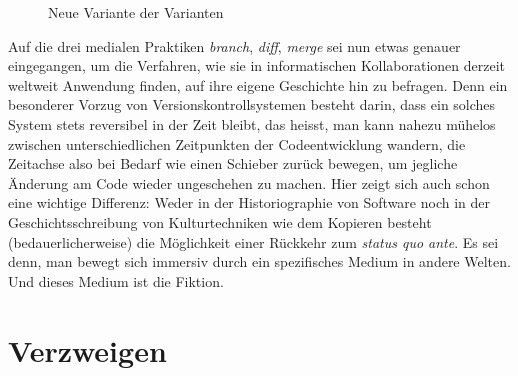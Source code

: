 \documentclass[a4paper,11pt]{article}
\newcommand{\inanf}[1]{›#1‹}
\begin{document}
\begin{figure}[hpt]
\begin{center}
\end{center}
\caption{Neue Variante der Varianten}\label{abb:merge}
\end{figure}

Auf die drei medialen Praktiken \emph{branch}, \emph{diff}, \emph{merge} sei nun etwas genauer eingegangen, um die Verfahren, wie sie in informatischen Kollaborationen derzeit weltweit Anwendung finden, auf ihre eigene Geschichte hin zu befragen. Denn ein besonderer Vorzug von Versionskontrollsystemen besteht darin, dass ein solches System stets reversibel in der Zeit bleibt, das heisst, man kann nahezu mühelos zwischen unterschiedlichen Zeitpunkten der Codeentwicklung wandern, die Zeitachse also bei Bedarf wie einen Schieber zurück bewegen, um jegliche Änderung am Code wieder ungeschehen zu machen. Hier zeigt sich auch schon eine wichtige Differenz: Weder in der Historiographie von Software noch in der Geschichtsschreibung von Kulturtechniken wie dem Kopieren besteht (bedauerlicherweise) die Möglichkeit einer Rückkehr zum \emph{status quo ante}. Es sei denn, man bewegt sich immersiv durch ein spezifisches Medium in andere Welten. Und dieses Medium ist die Fiktion.


\section{Verzweigen}
\end{document}
